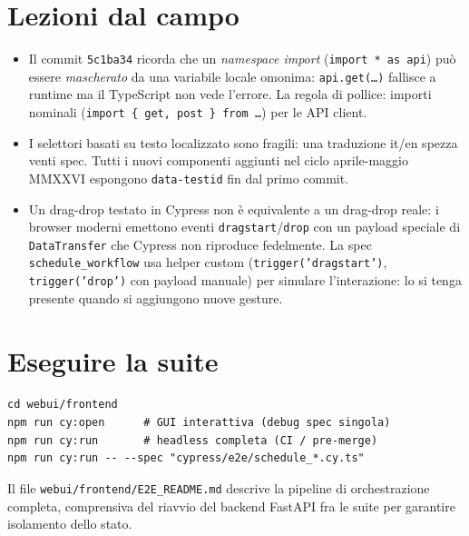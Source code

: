 \section{Lezioni dal campo}

\begin{erroricomunibox}
\begin{itemize}
  \item Il commit \texttt{5c1ba34} ricorda che un
    \emph{namespace import} (\texttt{import * as api}) pu\`o
    essere \emph{mascherato} da una variabile locale omonima:
    \texttt{api.get(\dots)} fallisce a runtime ma il TypeScript
    non vede l'errore. La regola di pollice: importi nominali
    (\texttt{import \{ get, post \} from \dots}) per le API
    client.
  \item I selettori basati su testo localizzato sono fragili:
    una traduzione it/en spezza venti spec. Tutti i nuovi
    componenti aggiunti nel ciclo aprile-maggio MMXXVI
    espongono \texttt{data-testid} fin dal primo commit.
  \item Un drag-drop testato in Cypress non \`e equivalente a
    un drag-drop reale: i browser moderni emettono eventi
    \texttt{dragstart}/\texttt{drop} con un payload speciale
    di \texttt{DataTransfer} che Cypress non riproduce
    fedelmente. La spec \texttt{schedule\_workflow} usa
    helper custom (\texttt{trigger('dragstart')},
    \texttt{trigger('drop')} con payload manuale) per simulare
    l'interazione: lo si tenga presente quando si aggiungono
    nuove gesture.
\end{itemize}
\end{erroricomunibox}

\section{Eseguire la suite}

\begin{lstlisting}[basicstyle=\ttfamily\footnotesize]
cd webui/frontend
npm run cy:open      # GUI interattiva (debug spec singola)
npm run cy:run       # headless completa (CI / pre-merge)
npm run cy:run -- --spec "cypress/e2e/schedule_*.cy.ts"
\end{lstlisting}

Il file \texttt{webui/frontend/E2E\_README.md} descrive la
pipeline di orchestrazione completa, comprensiva del riavvio
del backend FastAPI fra le suite per garantire isolamento dello
stato.
